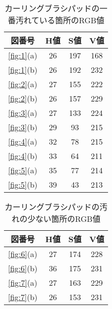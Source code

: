 \documentclass[main]{subfiles}
\begin{document}
\begin{table}[h]
    \caption{カーリングブラシパッドの一番汚れている箇所のRGB値}
    \label{table:HSV1}
    \centering
\begin{tabular}{c|c|c|c}
    図番号 & H値 & S値 & V値 \\ \hline
   \ref{fig:1}(a) & 26 & 197 & 168 \\ \hline
   \ref{fig:1}(b) & 26 & 192 & 232 \\ \hline\hline
   \ref{fig:2}(a) & 27 & 155 & 222 \\ \hline
   \ref{fig:2}(b) & 26 & 157 & 229 \\ \hline
   \ref{fig:3}(a) & 27 & 133 & 224 \\ \hline
   \ref{fig:3}(b) & 29 & 93 & 215 \\ \hline\hline
   \ref{fig:4}(a) & 32 & 78 & 215 \\ \hline
   \ref{fig:4}(b) & 33 & 64 & 211 \\ \hline
   \ref{fig:5}(a) & 35 & 77 & 214 \\ \hline
   \ref{fig:5}(b) & 39 & 43 & 213 \\
\end{tabular}    
\end{table}

\begin{table}[h]
    \caption{カーリングブラシパッドの汚れの少ない箇所のRGB値}
    \label{table:RGB2}
    \centering
\begin{tabular}{c|c|c|c}
    図番号 & H値 & S値 & V値 \\ \hline
   \ref{fig:6}(a) & 27 & 174 & 228 \\ \hline
   \ref{fig:6}(b) & 36 & 175 & 231 \\ \hline\hline
   \ref{fig:7}(a) & 27 & 163 & 229 \\ \hline
   \ref{fig:7}(b) & 26 & 153 & 231 \\ 
\end{tabular}    
\end{table}
\end{document}
